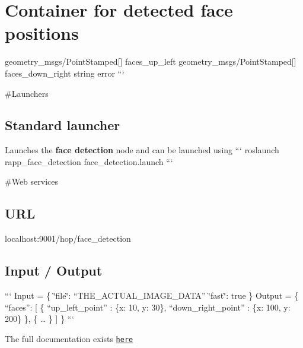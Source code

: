 \section*{Container for detected face positions}

geometry\-\_\-msgs/\-Point\-Stamped\mbox{[}\mbox{]} faces\-\_\-up\-\_\-left geometry\-\_\-msgs/\-Point\-Stamped\mbox{[}\mbox{]} faces\-\_\-down\-\_\-right string error ```

\#\-Launchers

\subsection*{Standard launcher}

Launches the {\bfseries face detection} node and can be launched using ``` roslaunch rapp\-\_\-face\-\_\-detection face\-\_\-detection.\-launch ```

\#\-Web services

\subsection*{U\-R\-L}

{\ttfamily localhost\-:9001/hop/face\-\_\-detection}

\subsection*{Input / Output}

``` Input = \{ \char`\"{}file\char`\"{}\-: “\-T\-H\-E\-\_\-\-A\-C\-T\-U\-A\-L\-\_\-\-I\-M\-A\-G\-E\-\_\-\-D\-A\-T\-A” \char`\"{}fast\char`\"{}\-: true \} {\ttfamily  } Output = \{ “faces”\-: \mbox{[} \{ “up\-\_\-left\-\_\-point” \-: \{x\-: 10, y\-: 30\}, “down\-\_\-right\-\_\-point” \-: \{x\-: 100, y\-: 200\} \}, \{ … \} \mbox{]} \} ```

The full documentation exists \href{https://github.com/rapp-project/rapp-platform/tree/master/rapp_web_services/services#face-detection}{\tt here} 